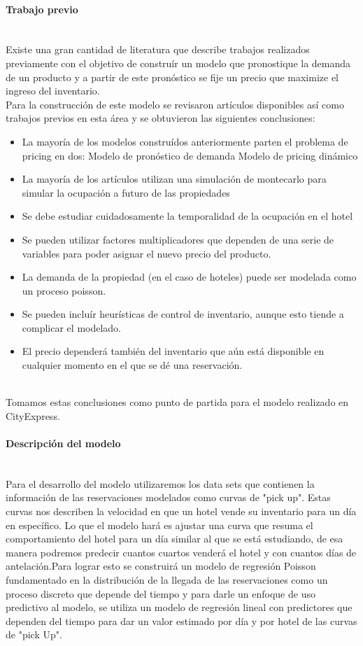 \documentclass{article}\usepackage[]{graphicx}\usepackage[]{color}
\begin{document}
\paragraph{Trabajo previo}~\\
Existe una gran cantidad de literatura que describe trabajos realizados previamente con el objetivo de construír un modelo que pronostique la demanda de un producto y a partir de este pronóstico se fije un precio que maximize el ingreso del inventario.
~\\
Para la construcción de este modelo se revisaron artículos disponibles así como trabajos previos en esta área y se obtuvieron las siguientes conclusiones:
\begin{itemize}[noitemsep]
\item La mayoría de los modelos construídos anteriormente parten el problema de pricing en dos:
\subitem Modelo de pronóstico de demanda
\subitem Modelo de pricing dinámico
\item La mayoría de los artículos utilizan una simulación de montecarlo para simular la ocupación a futuro de las propiedades
\item Se debe estudiar cuidadosamente la temporalidad de la ocupación en el hotel
\item Se pueden utilizar factores multiplicadores que dependen de una serie de variables para poder asignar el nuevo precio del producto.
\item La demanda de la propiedad (en el caso de hoteles) puede ser modelada como un proceso poisson.
\item Se pueden incluír heurísticas de control de inventario, aunque esto tiende a complicar el modelado.
\item El precio dependerá también del inventario que aún está disponible en cualquier momento en el que se dé una reservación.
\end{itemize}
~\\
Tomamos estas conclusiones como punto de partida para el modelo realizado en CityExpress.

\paragraph{Descripción del modelo} ~\\
Para el desarrollo del modelo utilizaremos los data sets que contienen la información de las reservaciones modelados como curvas de "pick up". Estas curvas nos describen la velocidad en que un hotel vende su inventario para un día en específico. Lo que el modelo hará es ajustar una curva que resuma el comportamiento del hotel para un día similar al que se está estudiando, de esa manera podremos predecir cuantos cuartos venderá el hotel y con cuantos días de antelación.Para lograr esto se construirá un modelo de regresión Poisson fundamentado en la distribución de la llegada de las reservaciones como un proceso discreto que depende del tiempo y para darle un enfoque de uso predictivo al modelo, se utiliza un modelo de regresión lineal con predictores que dependen del tiempo para dar un valor estimado por día y por hotel de las curvas de "pick Up".
\end{document}
